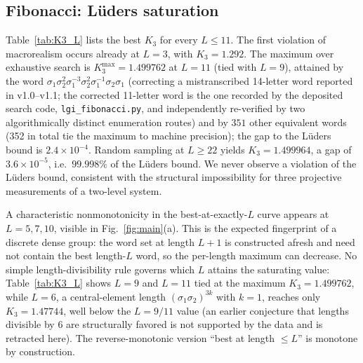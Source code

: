 \documentclass[aps,prx,reprint,amsmath,amssymb,floatfix,nofootinbib,superscriptaddress]{revtex4-2}
\begin{document}
\subsection{Fibonacci: L\"uders saturation}

Table~\ref{tab:K3_L} lists the best $K_{3}$ for every $L \leq 11$.
The first violation of macrorealism occurs already at $L=3$, with
$K_{3} = 1.292$. The maximum over exhaustive search is
$K_{3}^{\max} = 1.499762$ at $L=11$ (tied with $L=9$), attained by the word
$\sigma_{1}\sigma_{2}^{2}\sigma_{1}^{-3}\sigma_{2}^{2}\sigma_{1}^{-1}\sigma_{2}\sigma_{1}$
(correcting a mistranscribed 14-letter word reported in v1.0--v1.1;
the corrected 11-letter word is the one recorded by the deposited
search code, \texttt{lgi\_fibonacci.py}, and independently
re-verified by two algorithmically distinct enumeration routes) and
by $351$ other equivalent words (352 in total tie the maximum to
machine precision); the gap to the L\"uders bound is
$2.4\times 10^{-4}$. Random sampling at $L \geq 22$ yields
$K_{3} = 1.499964$, a gap of $3.6\times 10^{-5}$, i.e.\ $99.998\%$ of
the L\"uders bound. We never observe a violation of the L\"uders
bound, consistent with the structural impossibility for three
projective measurements of a two-level system.

A characteristic nonmonotonicity in the best-at-exactly-$L$ curve
appears at $L = 5,7,10$, visible in Fig.~\ref{fig:main}(a). This is the
expected fingerprint of a discrete dense group: the word set at
length $L+1$ is constructed afresh and need not contain the best
length-$L$ word, so the per-length maximum can decrease.
No simple length-divisibility rule governs which $L$ attains the
saturating value: Table~\ref{tab:K3_L} shows $L=9$ and $L=11$ tied at
the maximum $K_{3}=1.499762$, while $L=6$, a central-element length
$(\sigma_{1}\sigma_{2})^{3k}$ with $k=1$, reaches only $K_{3}=1.47744$,
well below the $L=9/11$ value (an earlier conjecture that lengths
divisible by $6$ are structurally favored is not supported by the
data and is retracted here). The reverse-monotonic version
``best at length $\leq L$'' is monotone by construction.
\end{document}
